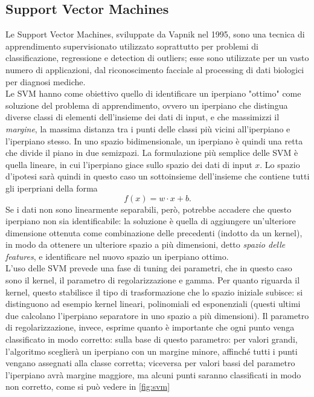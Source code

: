 \documentclass{article}
\begin{document}
	
	\subsection{Support Vector Machines}
	Le Support Vector Machines, sviluppate da Vapnik nel 1995, sono una tecnica di apprendimento supervisionato utilizzato soprattutto per problemi di classificazione, regressione e detection di outliers; esse sono utilizzate per un vasto numero di applicazioni, dal riconoscimento facciale al processing di dati biologici per diagnosi mediche.\\
	Le SVM hanno come obiettivo quello di identificare un iperpiano "ottimo" come soluzione del problema di apprendimento, ovvero un iperpiano che distingua diverse classi di elementi dell'insieme dei dati di input, e che massimizzi il \textit{margine}, la massima distanza tra i punti delle classi più vicini all'iperpiano e l'iperpiano stesso. In uno spazio bidimensionale, un iperpiano è quindi una retta che divide il piano in due semizpazi. La formulazione più semplice delle SVM è quella lineare, in cui l'iperpiano giace sullo spazio dei dati di input $x$. Lo spazio d'ipotesi sarà quindi in questo caso un sottoinsieme dell'insieme che contiene tutti gli iperpriani della forma 
	\[
	f(x) = w\cdot x+b\text{.}
	\]
	Se i dati non sono linearmente separabili, però, potrebbe accadere che questo iperpiano non sia identificabile: la soluzione è quella di aggiungere un'ulteriore dimensione ottenuta come combinazione delle precedenti (indotto da un kernel), in modo da ottenere un ulteriore spazio a più dimensioni, detto \textit{spazio delle features}, e identificare nel nuovo spazio un iperpiano ottimo.\\
	
	L'uso delle SVM prevede una fase di tuning dei parametri, che in questo caso sono il kernel, il parametro di regolarizzazione e gamma. Per quanto riguarda il kernel, questo stabilisce il tipo di trasformazione che lo spazio iniziale subisce: si distinguono ad esempio kernel lineari, polinomiali ed esponenziali (questi ultimi due calcolano l'iperpiano separatore in uno spazio a più dimensioni). Il parametro di regolarizzazione, invece, esprime quanto è importante che ogni punto venga classificato in modo corretto: sulla base di questo parametro: per valori grandi, l'algoritmo sceglierà un iperpiano con un margine minore, affinché tutti i punti vengano assegnati alla classe corretta; viceversa per valori bassi del parametro l'iperpiano avrà margine maggiore, ma alcuni punti saranno classificati in modo non corretto, come si può vedere in \ref{fig:svm}
	
\end{document}
